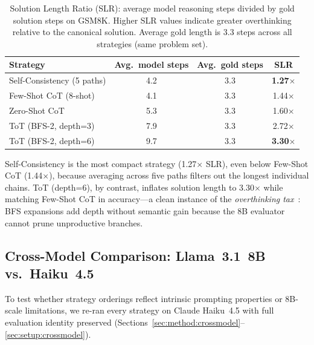 ﻿\documentclass[runningheads]{llncs}
\begin{document}
\begin{table}[H]
\centering
\caption{Solution Length Ratio (SLR): average model reasoning steps
divided by gold solution steps on GSM8K. Higher SLR values indicate
greater overthinking relative to the canonical solution. Average gold
length is 3.3 steps across all strategies (same problem set).}
\label{tab:slr}
\begin{tabular}{@{}lccc@{}}
\toprule
\textbf{Strategy} & \textbf{Avg.\ model steps} &
\textbf{Avg.\ gold steps} & \textbf{SLR} \\
\midrule
Self-Consistency (5 paths)    & 4.2  & 3.3 & \textbf{1.27$\times$} \\
Few-Shot CoT (8-shot)         & 4.1  & 3.3 & 1.44$\times$ \\
Zero-Shot CoT                 & 5.3  & 3.3 & 1.60$\times$ \\
ToT (BFS-2, depth=3)          & 7.9  & 3.3 & 2.72$\times$ \\
ToT (BFS-2, depth=6)          & 9.7  & 3.3 & \textbf{3.30$\times$} \\
\bottomrule
\end{tabular}
\end{table}

Self-Consistency is the most compact strategy (1.27$\times$ SLR), even
below Few-Shot CoT (1.44$\times$), because averaging across five paths
filters out the longest individual chains.
ToT (depth=6), by contrast, inflates solution length to 3.30$\times$
while matching Few-Shot CoT in accuracy---a clean instance of the
\textit{overthinking tax}~\cite{wu2025whenmoreisless}: BFS expansions
add depth without semantic gain because the 8B evaluator cannot prune
unproductive branches.

\subsection{Cross-Model Comparison: Llama~3.1~8B vs.\ Haiku~4.5}
\label{sec:results:crossmodel}

To test whether strategy orderings reflect intrinsic prompting
properties or 8B-scale limitations, we re-ran every strategy on
Claude Haiku~4.5 with full evaluation identity preserved
(Sections~\ref{sec:method:crossmodel}--\ref{sec:setup:crossmodel}).
\end{document}
